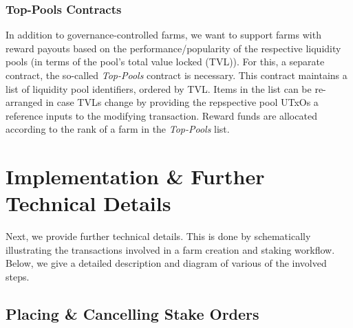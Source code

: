 \documentclass[12pt,parskip=full, tikz]{article}
\begin{document}
\subsubsection{Top-Pools Contracts}
In addition to governance-controlled farms, we want to support farms with reward payouts based on the performance/popularity of the respective liquidity pools (in terms of the pool's total value locked (TVL)). For this, a separate contract, the so-called \emph{Top-Pools} contract is necessary. This contract maintains a list of liquidity pool identifiers, ordered by TVL. Items in the list can be re-arranged in case TVLs change by providing the repspective pool UTxOs a reference inputs to the modifying transaction. Reward funds are allocated according to the rank of a farm in the \emph{Top-Pools} list.


\section{Implementation \& Further Technical Details}

Next, we provide further technical details. This is done by schematically illustrating the transactions involved in a farm creation and staking workflow. Below, we give a detailed description and diagram of various of the involved steps.

\subsection{Placing \& Cancelling Stake Orders}
\end{document}
